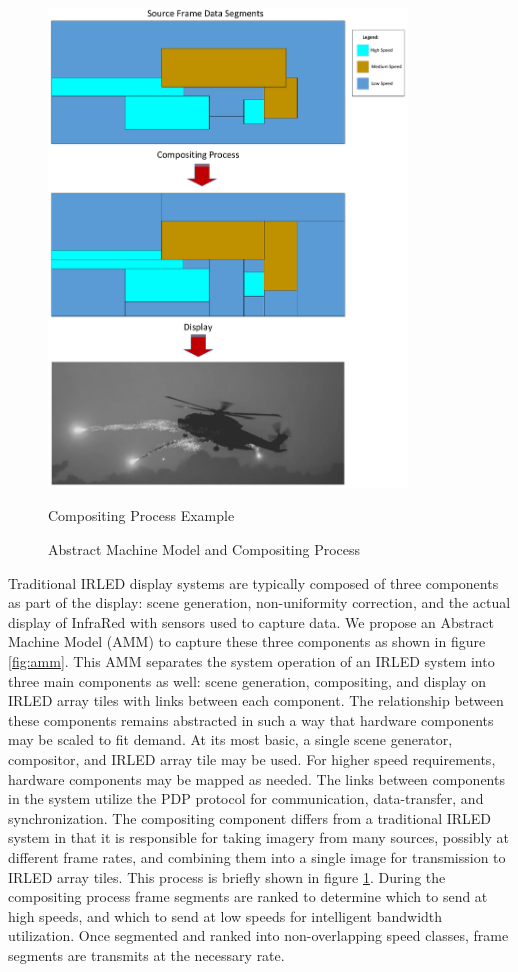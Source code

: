 \begin{figure}
        \centering
        \includegraphics[width=0.85\textwidth]{fig/compositing.pdf}
        \caption{Compositing Process Example}
        \label{fig:compositing}
    \caption{Abstract Machine Model and Compositing Process}
\end{figure}


Traditional IRLED display systems are typically composed of three components as part of the display: scene generation, non-uniformity correction, and the actual display of InfraRed with sensors used to capture data. We propose an Abstract Machine Model (AMM) to capture these three components as shown in figure \ref{fig:amm}. This AMM separates the system operation of an IRLED system into three main components as well: scene generation, compositing, and display on IRLED array tiles with links between each component. The relationship between these components remains abstracted in such a way that hardware components may be scaled to fit demand. At its most basic, a single scene generator, compositor, and IRLED array tile may be used. For higher speed requirements, hardware components may be mapped as needed. The links between components in the system utilize the PDP protocol for communication, data-transfer, and synchronization. The compositing component differs from a traditional IRLED system in that it is responsible for taking imagery from many sources, possibly at different frame rates, and combining them into a single image for transmission to IRLED array tiles. This process is briefly shown in figure \ref{fig:compositing}. During the compositing process frame segments are ranked to determine which to send at high speeds, and which to send at low speeds for intelligent bandwidth utilization. Once segmented and ranked into non-overlapping speed classes, frame segments are transmits at the necessary rate.

